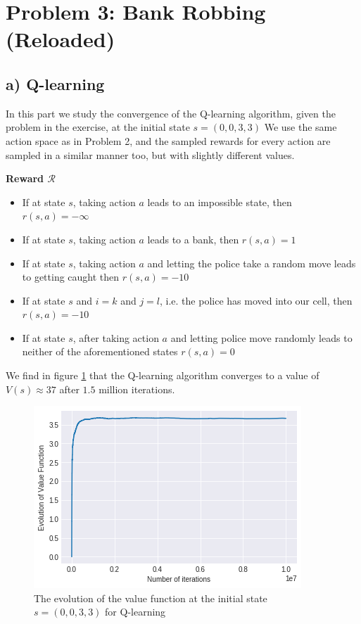 \documentclass{article}
\begin{document}
\newpage
\section{Problem 3: Bank Robbing (Reloaded)}
\subsection{a) Q-learning}
In this part we study the convergence of the Q-learning algorithm, given the problem in the exercise, at the initial state $s=(0,0,3,3)$
We use the same action space as in Problem 2, and the sampled rewards for every action are sampled in a similar manner too, but with slightly different values. 

\textbf{Reward $\mathcal{R}$}
\begin{itemize}
    \item If at state $s$, taking action $a$ leads to an impossible state, then $r(s,a) = -\infty$
    \item If at state $s$, taking action $a$ leads to a bank, then  $ r(s,a) = 1 $
    \item If at state $s$, taking action $a$ and letting the police take a random move leads to getting caught then $r(s,a)=-10$  
    \item If at state $s$ and $i=k$ and $j=l$, i.e. the police has moved into our cell, then $r(s,a)=-10$  
    \item If at state $s$, after taking action $a$ and letting police move randomly leads to neither of the aforementioned states $ r(s,a) = 0 $
\end{itemize}

We find in figure \ref{fig:q3-q-learn} that the Q-learning algorithm converges to a value of $V(s)\approx 37$ after $1.5$ million iterations.

\begin{figure}[h!]
    \centering
    \includegraphics[width=0.6\linewidth]{img/Q_learning.png}
    \caption{The evolution of the value function at the initial state $s=(0,0,3,3)$ for Q-learning}
    \label{fig:q3-q-learn}
\end{figure}
\end{document}
